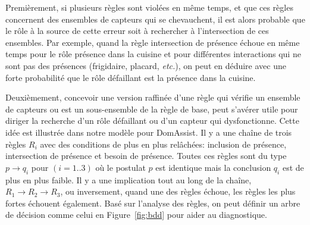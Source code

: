 Premièrement, si plusieurs règles sont violées en même temps, et que ces règles concernent des ensembles de capteurs qui se chevauchent, il est alors probable que le rôle à la source de cette erreur soit à rechercher à l'intersection de ces ensembles. Par exemple, quand la règle intersection de présence échoue en même temps pour le rôle présence dans la cuisine et pour différentes interactions qui ne sont pas des présences (frigidaire, placard, {\em etc.}), on peut en déduire avec une forte probabilité que le rôle défaillant est la présence dans la cuisine. 

Deuxièmement, concevoir une version raffinée d'une règle qui vérifie un ensemble de capteurs ou est un sous-ensemble de la règle de base, peut s'avérer utile pour diriger la recherche d'un rôle défaillant ou d'un capteur qui dysfonctionne. Cette idée est illustrée dans notre modèle pour DomAssist. Il y a une chaîne de trois règles $R_i$ avec des conditions de plus en plus relâchées: inclusion de présence, intersection de présence et besoin de présence. Toutes ces règles sont du type $p \rightarrow q_i$ pour $(i=1..3)$ où le postulat $p$ est identique mais la conclusion $q_i$ est de plus en plus faible. Il y a une implication tout au long de la chaîne, $R_1 \rightarrow R_2 \rightarrow R_3$, ou inversement, quand une des règles échoue, les règles les plus fortes échouent également. Basé sur l'analyse des règles, on peut définir un arbre de décision comme celui en Figure~\ref{fig:bdd} pour aider au diagnostique.


